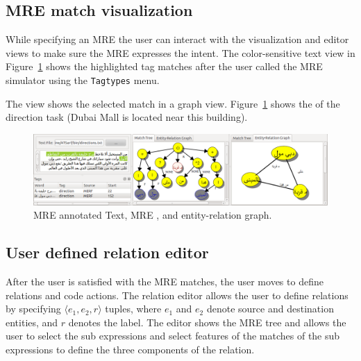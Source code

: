 \vspace{-1em}
\subsection{MRE match visualization}

While specifying an MRE the user can interact with the visualization and editor views
to make sure the MRE expresses the intent. 
The color-sensitive text view in Figure~\ref{fig:treegraph} shows 
the highlighted tag matches after the user called the MRE simulator using 
the {\tt Tagtypes} menu. 

The  view shows the selected match in a graph view.
Figure~\ref{fig:treegraph} shows the  of the direction task 
(Dubai Mall is located near this building). 

\begin{figure}[tb]
  \centering
  \includegraphics[width=\textwidth]{figures/treegraph}
  \vspace{-2em}
  \caption{\label{fig:treegraph}MRE annotated Text, MRE , and entity-relation graph.}
\end{figure}


\subsection{User defined relation editor}

After the user is satisfied with the MRE matches, 
the user moves to define relations and code actions. 
The relation editor allows the user to define relations 
by specifying $\langle e_1,e_2,r\rangle$ tuples, 
where $e_1$ and $e_2$ denote source and destination entities, and $r$ denotes 
the label.
The editor shows the MRE tree and allows the user to select the sub 
expressions and select features 
of the matches of the sub expressions to define the three components of the relation. 

